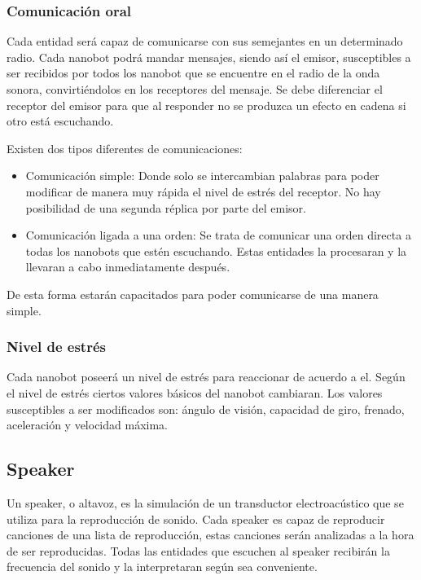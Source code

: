 \subsubsection{Comunicación oral}
\label{sec:comunicacion_oral}

Cada entidad será capaz de comunicarse con sus semejantes en un determinado radio.  Cada nanobot podrá mandar mensajes, siendo así el emisor, susceptibles a ser recibidos por todos los nanobot que se encuentre en el radio de la onda sonora, convirtiéndolos en los receptores del mensaje. Se debe diferenciar el receptor del emisor para que al responder no se produzca un efecto en cadena si otro está escuchando.

Existen dos tipos diferentes de comunicaciones:
\begin{itemize}
 \item Comunicación simple: Donde solo se intercambian palabras para poder modificar de manera muy rápida el nivel de estrés del receptor. No hay posibilidad de una segunda réplica por parte del emisor. 
 \item Comunicación ligada a una orden: Se trata de comunicar una orden directa a todas los nanobots que estén escuchando. Estas entidades la procesaran y la llevaran a cabo inmediatamente después.  
\end{itemize}

De esta forma estarán capacitados para poder comunicarse de una manera simple. 

\subsubsection{Nivel de estrés}
\label{sec:nivel_estres}
Cada nanobot poseerá un nivel de estrés para reaccionar de acuerdo a el. Según el nivel de estrés  ciertos valores básicos del nanobot cambiaran. Los valores susceptibles a ser modificados son:  ángulo de visión, capacidad de giro, frenado, aceleración y velocidad máxima. 

\subsection{Speaker}
\label{sec:speaker}
Un speaker, o altavoz, es la simulación de un transductor electroacústico que se utiliza para la reproducción de sonido. Cada speaker es capaz de reproducir canciones de una lista de reproducción, estas canciones serán analizadas a la hora de ser reproducidas. Todas las entidades que escuchen al speaker recibirán la frecuencia del sonido y la interpretaran según sea conveniente.
 
